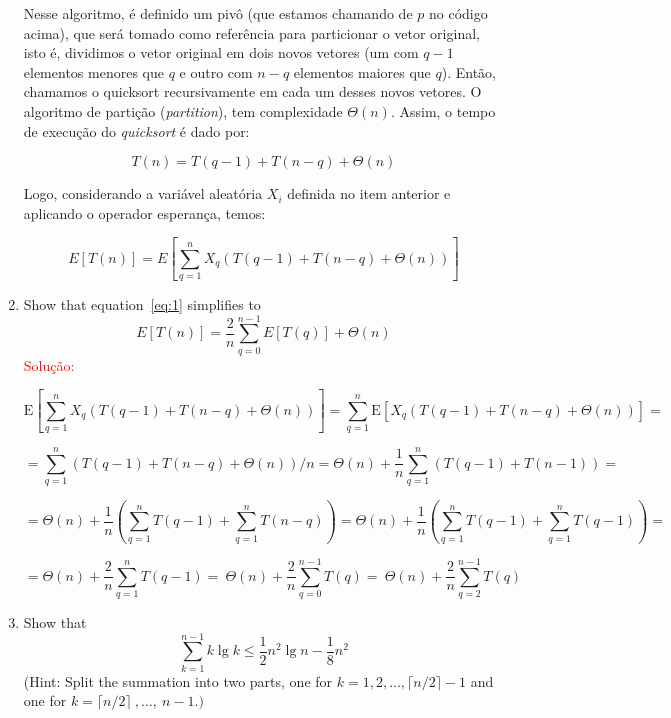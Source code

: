 \documentclass{article}
\begin{document}
\begin{enumerate}[label=(\alph*)]
  Nesse algoritmo, é definido um pivô (que estamos chamando de $p$ no código acima), que será tomado como referência para particionar o vetor original, isto é, dividimos o vetor original em dois novos vetores (um com $q-1$ elementos menores que $q$ e outro com $n-q$ elementos maiores que $q$). Então, chamamos o quicksort recursivamente em cada um desses novos vetores. O algoritmo de partição (\textit{partition}), tem complexidade $\Theta(n)$. Assim, o tempo de execução do \textit{quicksort} é dado por: 
  
  $$
  T(n) = T(q-1) + T(n-q) + \Theta(n)
  $$
  
  Logo, considerando a variável aleatória $X_i$ definida no item anterior e aplicando o operador esperança, temos: 
  
  $$
  E[T(n)] = E[\sum_{q=1}^{n}X_q(T(q-1) + T(n-q) + \Theta(n))]
  $$ 
  
\vspace{\baselineskip}  
  \item Show that equation~\ref{eq:1} simplifies to
  \begin{equation} \label{eq:item-c}
    E[T(n)] = \frac{2}{n}\sum_{q=0}^{n-1}E[T(q)] + \Theta(n)
    \label{eq:2}
  \end{equation}
    \textcolor{red}{Solução: }
    
    $$
    \mathrm{E}\left[\sum_{q=1}^{n} X_{q}(T(q-1)+T(n-q)+\Theta(n))\right]
    =
    \sum_{q=1}^{n} \mathrm{E}\left[X_{q}(T(q-1)+T(n-q)+\Theta(n))\right]
    =
    $$
    
    $$
    =\sum_{q=1}^{n}(T(q-1)+T(n-q)+\Theta(n)) / n
    =\Theta(n)+\frac{1}{n} \sum_{q=1}^{n}(T(q-1)+T(n-1))
    =
    $$
    
    $$
    =\Theta(n)+\frac{1}{n}\left(\sum_{q=1}^{n} T(q-1)+\sum_{q=1}^{n} T(n-q)\right)
    =\Theta(n)+\frac{1}{n}\left(\sum_{q=1}^{n} T(q-1)+\sum_{q=1}^{n} T(q-1)\right) = 
    $$
    
    $$ 
    = \Theta(n)+\frac{2}{n} \sum_{q=1}^{n} T(q-1)
    =~\Theta(n)+\frac{2}{n} \sum_{q=0}^{n-1} T(q)
    =~\Theta(n)+\frac{2}{n} \sum_{q=2}^{n-1} T(q)
    $$

\vspace{\baselineskip}
  \item Show that
  \begin{equation} \label{eq:item-d}
    \sum_{k=1}^{n-1} k \lg k \leq \frac{1}{2}n^2\lg n - \frac{1}{8}n^2
    \label{eq:3}
  \end{equation}
  (Hint: Split the summation into two parts, one for $k=1,2, \ldots, \lceil n/2 \rceil - 1$ and \\ one for $k=\lceil n/2 \rceil~,\ldots,~n-1.)$
  

\end{enumerate}
\end{document}
